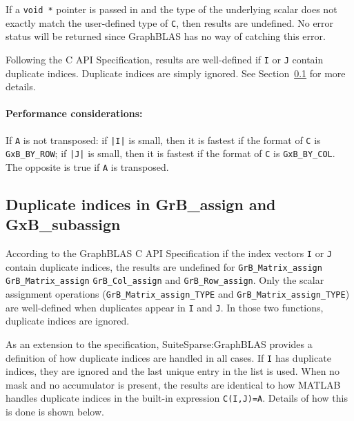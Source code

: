 \documentclass[12pt]{article}
\begin{document}
If a \verb'void *' pointer is passed in and the type of the underlying scalar
does not exactly match the user-defined type of \verb'C', then results are
undefined.  No error status will be returned since GraphBLAS has no way of
catching this error.

Following the C API Specification, results are well-defined if \verb'I' or
\verb'J' contain duplicate indices.  Duplicate indices are simply ignored.  See
Section~\ref{duplicates} for more details.

\paragraph{\bf Performance considerations:} %
If \verb'A' is not transposed: if \verb'|I|' is small, then it is fastest if
the format of \verb'C' is \verb'GxB_BY_ROW'; if \verb'|J|' is small, then it is
fastest if the format of \verb'C' is \verb'GxB_BY_COL'.  The opposite is true
if \verb'A' is transposed.

\newpage
\subsection{Duplicate indices in {\sf GrB\_assign} and {\sf GxB\_subassign}}
\label{duplicates}

According to the GraphBLAS C API Specification if the index vectors \verb'I' or
\verb'J' contain duplicate indices, the results are undefined for
\verb'GrB_Matrix_assign' \verb'GrB_Matrix_assign' \verb'GrB_Col_assign' and
\verb'GrB_Row_assign'.  Only the scalar assignment operations
(\verb'GrB_Matrix_assign_TYPE' and \verb'GrB_Matrix_assign_TYPE') are
well-defined when duplicates appear in \verb'I' and \verb'J'.  In those two
functions, duplicate indices are ignored.

As an extension to the specification, SuiteSparse:GraphBLAS provides a
definition of how duplicate indices are handled in all cases.  If \verb'I' has
duplicate indices, they are ignored and the last unique entry in the list is
used.  When no mask and no accumulator is present, the results are identical to
how MATLAB handles duplicate indices in the built-in expression
\verb'C(I,J)=A'.  Details of how this is done is shown below.
\end{document}
